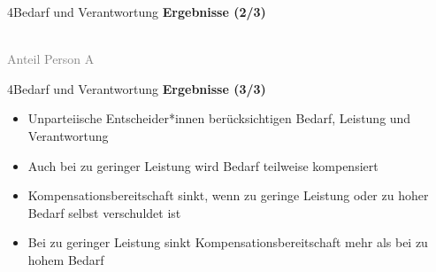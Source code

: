 \documentclass[xcolor=table,9pt,aspectratio=169]{beamer}
\begin{document}
\begin{frame}{\vspace*{10mm}4\hspace*{1em}Bedarf und Verantwortung}
\textbf{Ergebnisse (2/3)}\\
\medskip
\begin{center}
   \\
   \textcolor{gray}{Anteil Person A}
\end{center}
\end{frame}


\begin{frame}{\vspace*{10mm}4\hspace*{1em}Bedarf und Verantwortung}
\textbf{Ergebnisse (3/3)}\\
\medskip
\begin{itemize}
   \item Unparteiische Entscheider*innen berücksichtigen Bedarf, Leistung und Verantwortung
   \item Auch bei zu geringer Leistung wird Bedarf teilweise kompensiert
   \item Kompensationsbereitschaft sinkt, wenn zu geringe Leistung oder zu hoher Bedarf selbst verschuldet ist
   \item Bei zu geringer Leistung sinkt Kompensationsbereitschaft mehr als bei zu hohem Bedarf
\end{itemize}
\end{frame}
\end{document}
